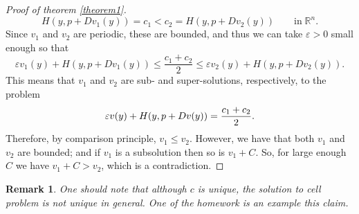 \documentclass[12pt, oneside]{amsart}  	%
\newtheorem{remark}{Remark}
\begin{document}
\begin{proof}[Proof of theorem \ref{theorem1}]
\begin{equation*}
H(y,p+Dv_1(y)) = c_1 < c_2 = H(y,p+Dv_2(y)) \qquad\text{in}\;\mathbb{R}^n.
\end{equation*}
Since $v_1$ and $v_2$ are periodic, these are bounded, and thus we can take $\varepsilon>0$ small enough so that
\begin{equation*}
\varepsilon v_1(y) + H(y,p+Dv_1(y)) \leq \frac{c_1+c_2}{2} \le\varepsilon v_2(y) + H(y,p+Dv_2(y)).
\end{equation*}
This means that $v_1$ and $v_2$ are sub- and super-solutions, respectively, to the problem
$$ \varepsilon v(y)+ H(y, p+ Dv(y)) = \frac{c_1+c_2}{2}.$$
Therefore, by comparison principle, $v_1 \le v_2$. However, we have that both $v_1$ and $v_2$ are bounded; and if $v_1$ is a subsolution then so is $v_1+C$. So, for large enough $C$ we have $v_1+C > v_2$, which is a contradiction.
\end{proof}
\begin{remark}
	One should note that although $c$ is unique, the solution to cell problem is not unique in general. One of the homework is an example this claim.
\end{remark}
\end{document}
